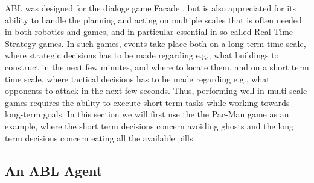 ABL was designed for the dialoge game Facade \cite{mateas2002abl}, but is also appreciated for its ability to handle the planning and acting on multiple scales 
that is often needed in both robotics and games, and in particular essential in so-called Real-Time Strategy games.
In such games, events take place both on a long term time scale, where strategic decisions has to be made regarding e.g., what buildings to construct
in the next few minutes, and where to locate them, and on a short term  time scale, where tactical decisions has to be made regarding e.g., what opponents to attack in the next few seconds.
Thus, performing well in multi-scale games requires the ability to execute short-term tasks while working towards long-term goals. 
In this section we will first use the the Pac-Man game as an example, 
where the short term decisions concern avoiding ghosts and the long term decisions concern eating all the available pills.

%






\subsection{An ABL Agent}

